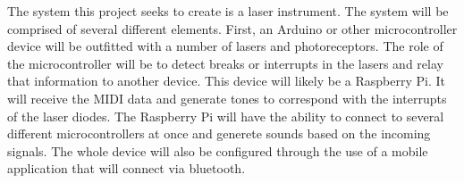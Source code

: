The system this project seeks to create is a laser instrument. The system will be comprised of several different elements. First, an Arduino or other microcontroller device will be outfitted with a number of lasers and photoreceptors. The role of the microcontroller will be to detect breaks or interrupts in the lasers and relay that information to another device. This device will likely be a Raspberry Pi. It will receive the MIDI data and generate tones to correspond with the interrupts of the laser diodes. The Raspberry Pi will have the ability to connect to several different microcontrollers at once and generete sounds based on the incoming signals. The whole device will also be configured through the use of a mobile application that will connect via bluetooth.
